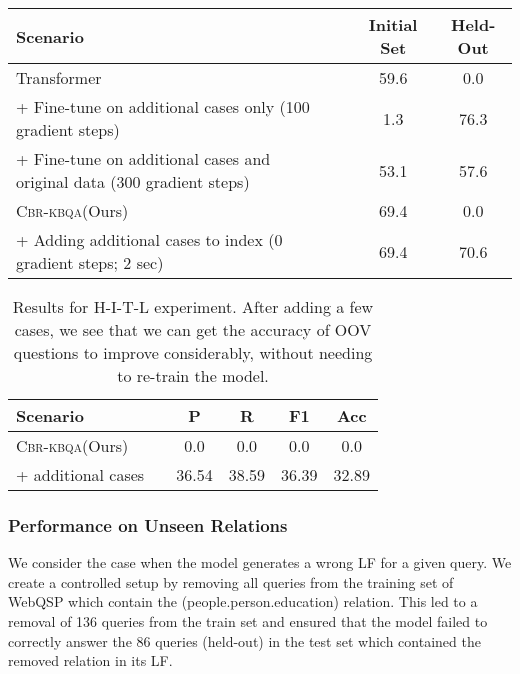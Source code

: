 \documentclass[11pt]{article}
\newcommand{\hitl}{\textsc{H-I-T-L}\xspace}
\newcommand{\alg}{\textsc{Cbr-kbqa}\xspace}
\begin{document}
\begin{table*}
    \centering
    \small
    \begin{tabular}{@{}l c c c@{}}
    \toprule
    Scenario && Initial Set & Held-Out \\
    \midrule
    Transformer     && 59.6 & 0.0 \\
    \quad + Fine-tune on additional cases only (100 gradient steps) && 1.3 & 76.3 \\
    \quad + Fine-tune on additional cases and original data (300 gradient steps) && 53.1 & 57.6 \\
    \midrule
    \alg (Ours) && 69.4 & 0.0 \\
    \quad + Adding additional cases to index (0 gradient steps; 2 sec) && 69.4 & 70.6 \\
    \bottomrule
    \end{tabular}
    \caption{\small Robustness and controllability of our method against black-box transformers. \alg can easily and quickly adopt to new relations given cases about it, whereas heavily parameterized transformer is not stable, and can undergo catastrophic forgetting when we try to add new relation information intro its parameters.}
    \label{tab:robust}
\end{table*}
\vspace{-2mm}
\begin{table}
    \centering
    \small
    \footnotesize
    \begin{tabular}{@{}l c c c c c@{}}
    \toprule
    Scenario && P & R & F1 & Acc \\
    \midrule
\alg (Ours) && 0.0 & 0.0 & 0.0 & 0.0 \\
    \quad + additional cases &&  36.54 & 38.59 & 36.39 & 32.89 \\
\bottomrule
    \end{tabular}
    \caption{\small Results for \hitl experiment. After adding a few cases, we see that we can get the accuracy of OOV questions to improve considerably, without needing to re-train the model.}
    \label{tab:hitl_results_appendix}
    \vspace{-2mm}
\end{table}


\subsubsection{Performance on Unseen Relations}
\label{subsub:unseen_rel}
We consider the case when the model generates a wrong LF for a given query. We create a controlled setup by removing all queries from the training set of WebQSP which contain the (people.person.education) relation. This led to a removal of 136 queries from the train set and ensured that the model failed to correctly answer the 86 queries (held-out) in the test set which contained the removed relation in its LF.
\end{document}
